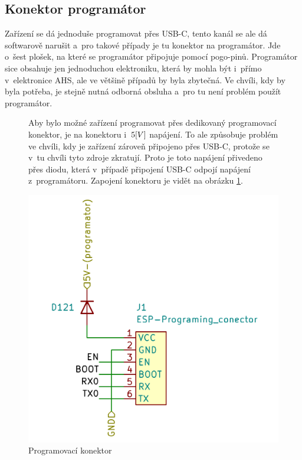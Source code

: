 \subsection{Konektor programátor}
Zařízení se dá jednoduše programovat přes USB-C, tento kanál se ale dá softwarově narušit a~pro takové případy je tu konektor na programátor.
Jde o~šest plošek, na které se programátor připojuje pomocí pogo-pinů.
Programátor sice obsahuje jen jednoduchou elektroniku, která by mohla být i~přímo v~elektronice AHS, ale ve většině případů by byla zbytečná.
Ve chvíli, kdy by byla potřeba, je stejně nutná odborná obsluha a~pro tu není problém použít programátor.
\begin{figure}[h]
    \begin{minipage}[l]{0.55\textwidth}
        
        Aby bylo možné zařízení programovat přes dedikovaný programovací konektor, je na konektoru i~\(5\-[V]\) napájení.
        To ale způsobuje problém ve chvíli, kdy je zařízení zároveň připojeno přes USB-C, protože se v~tu chvíli tyto zdroje zkratují.
        Proto je toto napájení přivedeno přes diodu, která v~případě připojení USB-C odpojí napájení z~programátoru.
        Zapojení konektoru je vidět na obrázku \ref{fig:programator}.
    \end{minipage}
    \hfill
    \begin{minipage}[r]{0.4\textwidth}
        \centering
        \includegraphics[width=\textwidth]{text/TeoretickyUvod/AplikaceHernichZarizeni/img/programator.png}
        \caption{Programovací konektor}
        \label{fig:programator}
    \end{minipage}
    
\end{figure}


